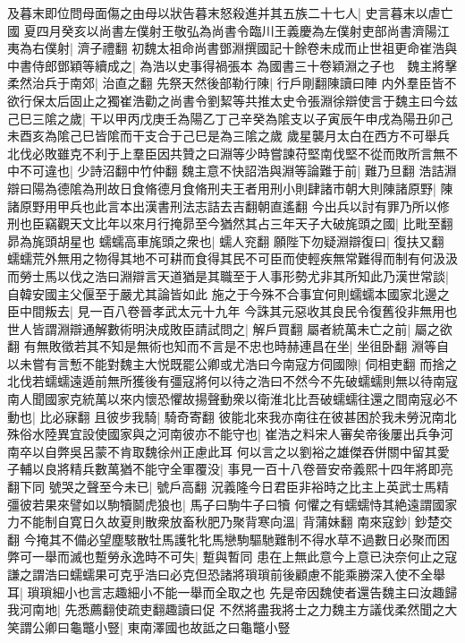 及暮末即位問母面傷之由母以狀告暮末怒殺進并其五族二十七人|{
	史言暮末以虐亡國}
夏四月癸亥以尚書左僕射王敬弘為尚書令臨川王義慶為左僕射吏部尚書濟陽江夷為右僕射|{
	濟子禮翻}
初魏太祖命尚書鄧淵撰國記十餘卷未成而止世祖更命崔浩與中書侍郎鄧穎等續成之|{
	為浩以史事得禍張本}
為國書三十卷穎淵之子也　魏主將擊柔然治兵于南郊|{
	治直之翻}
先祭天然後部勒行陳|{
	行戶剛翻陳讀曰陣}
内外羣臣皆不欲行保太后固止之獨崔浩勸之尚書令劉絜等共推太史令張淵徐辯使言于魏主曰今兹己巳三隂之歲|{
	干以甲丙戊庚壬為陽乙丁己辛癸為隂支以子寅辰午申戌為陽丑卯己未酉亥為隂己巳皆隂而干支合于己巳是為三隂之歲}
歲星襲月太白在西方不可舉兵北伐必敗雖克不利于上羣臣因共贊之曰淵等少時嘗諫苻堅南伐堅不從而敗所言無不中不可違也|{
	少詩沼翻中竹仲翻}
魏主意不快詔浩與淵等論難于前|{
	難乃旦翻}
浩詰淵辯曰陽為德隂為刑故日食脩德月食脩刑夫王者用刑小則肆諸市朝大則陳諸原野|{
	陳諸原野用甲兵也此言本出漢書刑法志詰去吉翻朝直遙翻}
今出兵以討有罪乃所以修刑也臣竊觀天文比年以來月行掩昴至今猶然其占三年天子大破旄頭之國|{
	比毗至翻昴為旄頭胡星也}
蠕蠕高車旄頭之衆也|{
	蠕人兖翻}
願陛下勿疑淵辯復曰|{
	復扶又翻}
蠕蠕荒外無用之物得其地不可耕而食得其民不可臣而使輕疾無常難得而制有何汲汲而勞士馬以伐之浩曰淵辯言天道猶是其職至于人事形勢尤非其所知此乃漢世常談|{
	自韓安國主父偃至于嚴尤其論皆如此}
施之于今殊不合事宜何則蠕蠕本國家北邊之臣中間叛去|{
	見一百八卷晉孝武太元十九年}
今誅其元惡收其良民令復舊役非無用也世人皆謂淵辯通解數術明決成敗臣請試問之|{
	解戶買翻}
屬者統萬未亡之前|{
	屬之欲翻}
有無敗徵若其不知是無術也知而不言是不忠也時赫連昌在坐|{
	坐徂卧翻}
淵等自以未嘗有言慙不能對魏主大悦既罷公卿或尤浩曰今南寇方伺國隙|{
	伺相吏翻}
而捨之北伐若蠕蠕遠遁前無所獲後有彊寇將何以待之浩曰不然今不先破蠕蠕則無以待南寇南人聞國家克統萬以來内懷恐懼故揚聲動衆以衛淮北比吾破蠕蠕往還之間南寇必不動也|{
	比必寐翻}
且彼步我騎|{
	騎奇寄翻}
彼能北來我亦南往在彼甚困於我未勞況南北殊俗水陸異宜設使國家與之河南彼亦不能守也|{
	崔浩之料宋人審矣帝後屢出兵争河南卒以自弊吳呂蒙不肯取魏徐州正慮此耳}
何以言之以劉裕之雄傑吞併關中留其愛子輔以良將精兵數萬猶不能守全軍覆没|{
	事見一百十八卷晉安帝義熙十四年將即亮翻下同}
號哭之聲至今未已|{
	號戶高翻}
況義隆今日君臣非裕時之比主上英武士馬精彊彼若果來譬如以駒犢鬬虎狼也|{
	馬子曰駒牛子曰犢}
何懼之有蠕蠕恃其絶遠謂國家力不能制自寛日久故夏則散衆放畜秋肥乃聚背寒向溫|{
	背蒲妹翻}
南來寇鈔|{
	鈔楚交翻}
今掩其不備必望塵駭散牡馬護牝牝馬戀駒驅馳難制不得水草不過數日必聚而困弊可一舉而滅也蹔勞永逸時不可失|{
	蹔與暫同}
患在上無此意今上意已決奈何止之寇謙之謂浩曰蠕蠕果可克乎浩曰必克但恐諸將瑣瑣前後顧慮不能乘勝深入使不全舉耳|{
	瑣瑣細小也言志趣細小不能一舉而全取之也}
先是帝因魏使者還告魏主曰汝趣歸我河南地|{
	先悉薦翻使疏吏翻趣讀曰促}
不然將盡我將士之力魏主方議伐柔然聞之大笑謂公卿曰龜鼈小豎|{
	東南澤國也故詆之曰龜鼈小豎}
